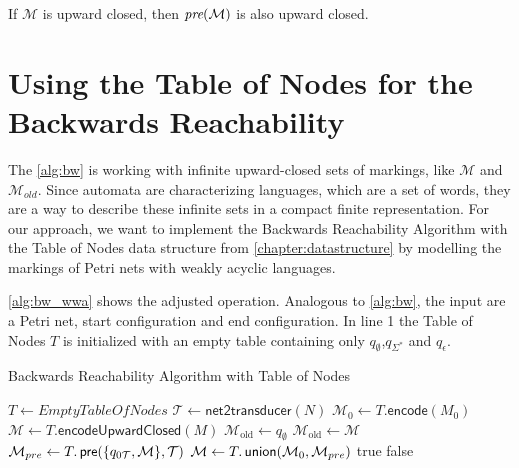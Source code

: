 \begin{lemma}\label{lem:uppre}
If $\mathcal{M}$ is upward closed, then $\operatorname{\textit{pre}}(\mathcal{M})$ is also upward closed.
\end{lemma}




\section{Using the Table of Nodes for the Backwards Reachability}
The \autoref{alg:bw} is working with infinite upward-closed sets of markings, like $\mathcal{M}$ and $\mathcal{M}_{old}$. Since automata are characterizing languages, which are a set of words, they are a way to describe these infinite sets in a compact finite representation. For our approach, we want to implement the Backwards Reachability Algorithm with the Table of Nodes data structure from \autoref{chapter:datastructure} by modelling the markings of Petri nets with weakly acyclic languages. 
\par
\autoref{alg:bw_wwa} shows the adjusted operation. Analogous to \autoref{alg:bw}, the input are a Petri net, start configuration and end configuration. In line 1 the Table of Nodes $T$ is initialized with an empty table containing only $q_{\emptyset}$,$q_{\Sigma^{*}}$ and $q_{\epsilon}$. 

\begin{algorithm}[htb]
\caption{Backwards Reachability Algorithm with Table of Nodes}\label{alg:bw_wwa}
\begin{algorithmic}[1]
\State $T \gets EmptyTableOfNodes$
\State $\mathcal{T} \gets \textsf{net2transducer}(N)$
\State $\mathcal{M}_{0} \gets T.\textsf{encode}(M_{0})$
\State $\mathcal{M} \gets T.\textsf{encodeUpwardClosed}(M)$
\State $\mathcal{M}_{\text{old}} \gets q_{\emptyset}$
	\State $\mathcal{M}_{\text{old}}  \gets \mathcal{M}$
	\State $\mathcal{M}_{pre} \gets T.\operatorname{\textsf{pre}}(\{q_{0\mathcal{T}},\mathcal{M}\},\mathcal{T})$
	\State $\mathcal{M} \gets T.\operatorname{\textsf{union}}(\mathcal{M}_{0}, \mathcal{M}_{pre})$
	\Return true
\EndIf
{}
    \Return false
\EndIf
\EndWhile
\end{algorithmic}
\end{algorithm}

